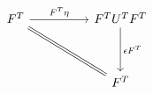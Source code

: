 \[\begin{tikzcd}
	{F^{T}} && {F^{T}U^{T}F^{T}} \\
	\\
	&& {F^{T}}
	\arrow["{F^{T}\eta}", from=1-1, to=1-3]
	\arrow["{\epsilon F^{T}}", from=1-3, to=3-3]
	\arrow[Rightarrow, no head, from=1-1, to=3-3]
\end{tikzcd}\]